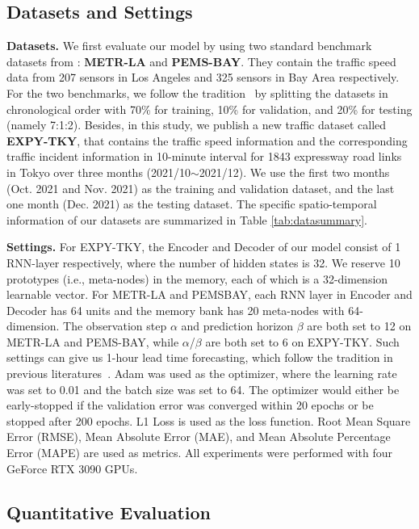 \documentclass[letterpaper]{article} \usepackage{aaai23}  \usepackage{times}  \usepackage{helvet}  \usepackage{courier}  \usepackage[hyphens]{url}  \usepackage{graphicx} \urlstyle{rm} \def\UrlFont{\rm}  \usepackage{natbib}  \usepackage{caption} \usepackage{multirow}
\begin{document}
\subsection{Datasets and Settings}\label{sec:experiment-setup}
\noindent\textbf{Datasets.} We first evaluate our model by using two standard benchmark datasets from \cite{li2018diffusion}: \textbf{METR-LA} and \textbf{PEMS-BAY}. They contain the traffic speed data from 207 sensors in Los Angeles and 325 sensors in Bay Area respectively. For the two benchmarks, we follow the tradition~\cite{li2018diffusion,wu2019graph,shang2021discrete,lee2021learning} by splitting the datasets in chronological order with 70\% for training, 10\% for validation, and 20\% for testing (namely 7:1:2). Besides, in this study, we publish a new traffic dataset called \textbf{EXPY-TKY}, that contains the traffic speed information and the corresponding traffic incident information in 10-minute interval for 1843 expressway road links in Tokyo over three months (2021/10$\sim$2021/12). We use the first two months (Oct. 2021 and Nov. 2021) as the training and validation dataset, and the last one month (Dec. 2021) as the testing dataset. The specific spatio-temporal information of our datasets are summarized in Table \ref{tab:datasummary}. 


\noindent\textbf{Settings.}
For EXPY-TKY, the Encoder and Decoder of our model consist of 1 RNN-layer respectively, where the number of hidden states is 32. We reserve 10 prototypes (i.e., meta-nodes) in the memory, each of which is a 32-dimension learnable vector. For METR-LA and PEMSBAY, each RNN layer in Encoder and Decoder has 64 units and the memory bank has 20 meta-nodes with 64-dimension. The observation step $\alpha$ and prediction horizon $\beta$ are both set to 12 on METR-LA and PEMS-BAY, while $\alpha$/$\beta$ are both set to 6 on EXPY-TKY. Such settings can give us 1-hour lead time forecasting, which follow the tradition in previous literatures~\cite{yu2018spatio,li2018diffusion,wu2019graph,bai2020adaptive,shang2021discrete}. Adam was used as the optimizer, where the learning rate was set to 0.01 and the batch size was set to 64. The optimizer would either be early-stopped if the validation error was converged within 20 epochs or be stopped after 200 epochs. L1 Loss is used as the loss function. Root Mean Square Error (RMSE), Mean Absolute Error (MAE), and Mean Absolute Percentage Error (MAPE) are used as metrics. All experiments were performed with four GeForce RTX 3090 GPUs. 


\subsection{Quantitative Evaluation}\label{sec:experiment-overall}
\end{document}
